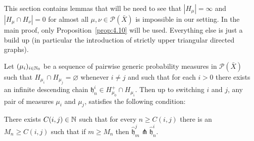 This section contains lemmas that will be need to see that \(|H_\mu| = \infty\) and \(|H_\mu \cap H_\nu| = 0\) for almost all \(\mu, \nu \in \mathcal{P}(\bar X)\) is impossible in our setting. In the main proof, only Proposition~\ref{prop:4.10} will be used. Everything else is just a build up (in particular the introduction of strictly upper triangular directed graphs).

\begin{lemma}[{\cite[Lemma~4.13]{MR3509968}}]
  \label{lem:4.13}
  Let \((\mu_i)_{i \in \mathbb{N}_0}\) be a sequence of pairwise generic probability measures in \(\mathcal{P}(\bar X)\) such that \(H_{\mu_i} \cap H_{\mu_j} = \varnothing\) whenever \(i \neq j\) and such that for each \(i > 0\) there exists an infinite descending chain \(\mathfrak{h}_n^i \in H_{\mu_0}^+ \cap H_{\mu_i}\). Then up to switching \(i\) and \(j\), any pair of measures \(\mu_i\) and \(\mu_j\), satisfies the following condition:

  There exists \(C(i,j) \in \mathbb{N}\) such that for every \(n \geq C(i,j)\) there is an \(M_n \geq C(i,j)\) such that if \(m \geq M_n\) then \(\mathfrak{\hat h}^j_m \pitchfork \mathfrak{\hat h}^i_n\). 
\end{lemma}

